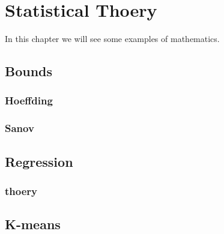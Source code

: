 \chapter{Statistical Thoery}
In this chapter we will see some examples of mathematics.

\lipsum[1]

\section{Bounds}

\subsection{Hoeffding}

\subsection{Sanov}

\section{Regression}

\subsection{thoery}

\section{K-means}
